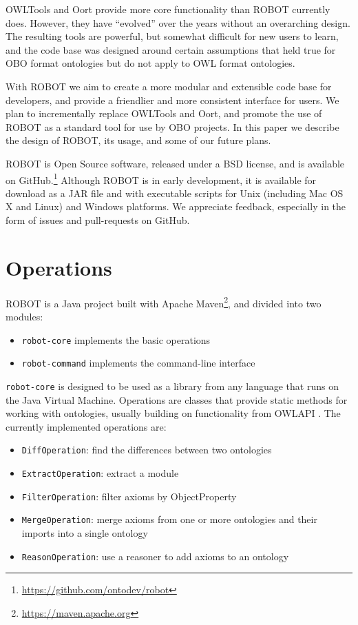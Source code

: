 \documentclass{icbo}
\begin{document}
OWLTools and Oort provide more core functionality than ROBOT currently does. However, they have ``evolved'' over the years without an overarching design. The resulting tools are powerful, but somewhat difficult for new users to learn, and the code base was designed around certain assumptions that held true for OBO format ontologies but do not apply to OWL format ontologies.

With ROBOT we aim to create a more modular and extensible code base for developers, and provide a friendlier and more consistent interface for users.  We plan to incrementally replace OWLTools and Oort, and promote the use of ROBOT as a standard tool for use by OBO projects. In this paper we describe the design of ROBOT, its usage, and some of our future plans.

ROBOT is Open Source software, released under a BSD license, and is available on GitHub.\footnote{\url{https://github.com/ontodev/robot}} Although ROBOT is in early development, it is available for download as a JAR file and with executable scripts for Unix (including Mac OS X and Linux) and Windows platforms. We appreciate feedback, especially in the form of issues and pull-requests on GitHub.


\section{Operations}

ROBOT is a Java project built with Apache Maven\footnote{\url{https://maven.apache.org}}, and divided into two modules:

\begin{itemize}
  \item {\tt robot-core} implements the basic operations
  \item {\tt robot-command} implements the command-line interface
\end{itemize}

\noindent
{\tt robot-core} is designed to be used as a library from any language that runs on the Java Virtual Machine. Operations are classes that provide static methods for working with ontologies, usually building on functionality from OWLAPI \citep{Horridge2011}. The currently implemented operations are:

\begin{itemize}
  \item {\tt DiffOperation}: find the differences between two ontologies
  \item {\tt ExtractOperation}: extract a module
  \item {\tt FilterOperation}: filter axioms by ObjectProperty
  \item {\tt MergeOperation}: merge axioms from one or more ontologies and their imports into a single ontology
  \item {\tt ReasonOperation}: use a reasoner to add axioms to an ontology
\end{itemize}
\end{document}
